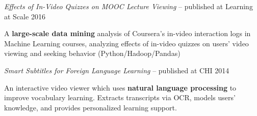 \documentclass[margin,line]{resume}
\begin{document}
\begin{resume}




\textit{Effects of In-Video Quizzes on MOOC Lecture Viewing} -- published at Learning at Scale 2016
\begin{compactitem}
\item A \textbf{large-scale data mining} analysis of Coursera's in-video interaction logs in Machine Learning courses, analyzing effects of in-video quizzes on users' video viewing and seeking behavior (Python/Hadoop/Pandas)
\end{compactitem}

\vspace{-2mm}

\textit{Smart Subtitles for Foreign Language Learning} -- published at CHI 2014
\begin{compactitem}
\item An interactive video viewer which uses \textbf{natural language processing} to improve vocabulary learning. Extracts transcripts via OCR, models users' knowledge, and provides personalized learning support.
\end{compactitem}


\end{resume}
\end{document}
